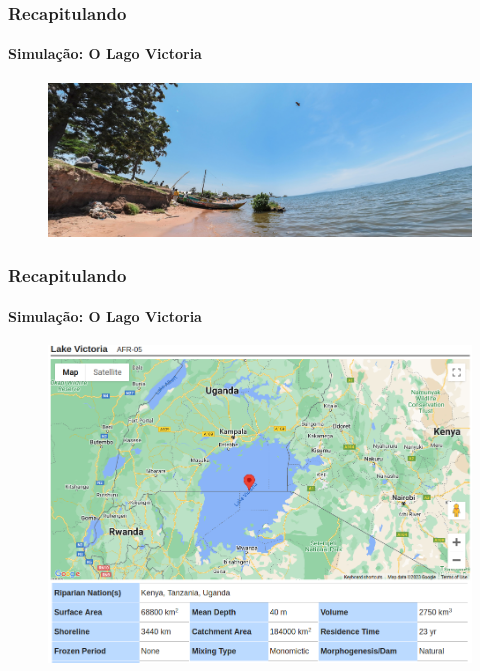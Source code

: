 \documentclass[aspectratio=169]{beamer} %
\begin{document}
{{\begin{frame}
\frametitle{Recapitulando}
	\framesubtitle{Simulação: O Lago Victoria}
	\pause
	\begin{figure}
		\centering
		\includegraphics[scale=0.15]{images/victoria2.png}
	\end{figure}
\end{frame} 
}


{
\begin{frame}

\frametitle{Recapitulando}
	\framesubtitle{Simulação: O Lago Victoria}
	\pause
	\begin{figure}
		\centering
		\includegraphics[scale=0.25]{images/victoria3.png}
	\end{figure}
\end{frame} 
}

}
\end{document}
